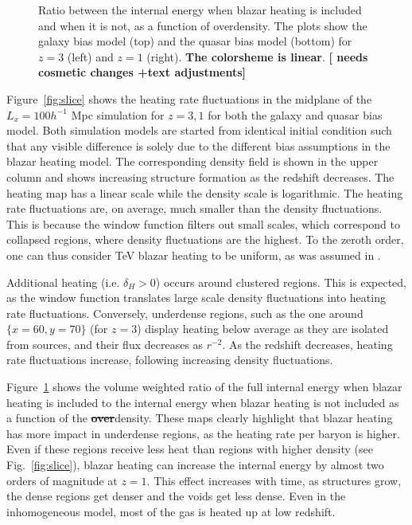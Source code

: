 \documentclass[numberedappendix]{emulateapj}
\newcommand\ALc[1]{{\color{red} \bf #1}} %
\begin{document}
{\begin{figure}
\caption{Ratio between the internal energy when blazar heating is included and when it is not, as a function of overdensity. The plots show the galaxy bias model (top) and the quasar bias model (bottom) for $z=3$ (left) and $z=1$ (right). \ALc{The colorsheme is linear}.\ALc{[{ needs cosmetic changes +text adjustments}]}}
\label{fig:heating_ratio}
\end{figure}
Figure~\ref{fig:slice} shows the heating rate fluctuations in the midplane of the $L_x=100h^{-1}$ Mpc simulation for $z=3,1$ for both the galaxy and quasar bias model. Both simulation models are started from identical initial condition such that any visible difference is solely due to the different bias assumptions in the blazar heating model. The corresponding density field is shown in the upper column and shows increasing structure formation as the redshift decreases. The heating map has a linear scale while the density scale is logarithmic. The heating rate fluctuations are, on average, much smaller than the density fluctuations. This is because the window function filters out small scales, which correspond to collapsed regions, where density fluctuations are the highest. To the zeroth order, one can thus consider TeV blazar heating to be uniform, as was assumed in \citet{2012ApJ...752...23C}.

Additional heating (i.e. $\delta_H>0$) occurs around clustered regions. This is expected, as the window function translates large scale density fluctuations into heating rate fluctuations. Conversely, underdense regions, such as the one around $\{x=60,y=70\}$ (for $z=3$) display heating below average as they are isolated from sources, and their flux decreases as $r^{-2}$. As the redshift decreases, heating rate fluctuations increase, following increasing density fluctuations.

Figure~\ref{fig:heating_ratio} shows the volume weighted ratio of the full internal energy when blazar heating is included to the internal energy when blazar heating is not included as a function of the \ALc{\sout{over}}density. These maps clearly highlight that blazar heating has more impact in underdense regions, as the heating rate per baryon is higher. Even if these regions receive less heat than regions with higher density (see Fig.~\ref{fig:slice}),  blazar heating can increase the internal energy by almost two orders of magnitude at $z=1$. This effect increases with time, as structures grow, the dense regions get denser and the voids get less dense. Even in the inhomogeneous model, most of the gas is heated up at low redshift.

}
\end{document}
